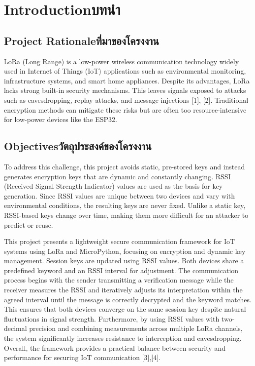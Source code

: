 \chapter{\ifenglish Introduction\else บทนำ\fi}

\section{\ifenglish Project Rationale\else ที่มาของโครงงาน\fi}

LoRa (Long Range) is a low-power wireless communication technology widely used in Internet of Things (IoT) applications such as environmental monitoring, infrastructure systems, and smart home appliances. Despite its advantages, LoRa lacks strong built-in security mechanisms. This leaves signals exposed to attacks such as eavesdropping, replay attacks, and message injections [1], [2]. Traditional encryption methods can mitigate these risks but are often too resource-intensive for low-power devices like the ESP32.

\section{\ifenglish Objectives\else วัตถุประสงค์ของโครงงาน\fi}

To address this challenge, this project avoids static, pre-stored keys and instead generates encryption keys that are dynamic and constantly changing. RSSI (Received Signal Strength Indicator) values are used as the basis for key generation. Since RSSI values are unique between two devices and vary with environmental conditions, the resulting keys are never fixed. Unlike a static key, RSSI-based keys change over time, making them more difficult for an attacker to predict or reuse.

This project presents a lightweight secure communication framework for IoT systems using LoRa and MicroPython, focusing on encryption and dynamic key management. Session keys are updated using RSSI values. Both devices share a predefined keyword and an RSSI interval for adjustment. The communication process begins with the sender transmitting a verification message while the receiver measures the RSSI and iteratively adjusts its interpretation within the agreed interval until the message is correctly decrypted and the keyword matches. This ensures that both devices converge on the same session key despite natural fluctuations in signal strength. Furthermore, by using RSSI values with two-decimal precision and combining measurements across multiple LoRa channels, the system significantly increases resistance to interception and eavesdropping. Overall, the framework provides a practical balance between security and performance for securing IoT communication [3],[4].

